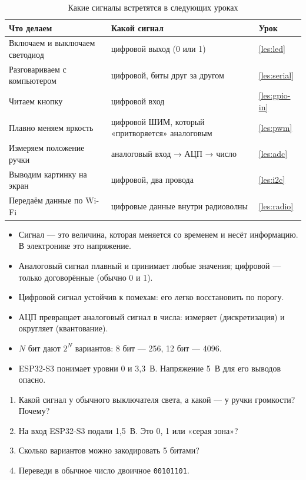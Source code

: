 \begin{table}[H]
\centering\small
\begin{tabularx}{\textwidth}{@{}l X l@{}}
\toprule
Что делаем & Какой сигнал & Урок\\
\midrule
Включаем и выключаем светодиод & цифровой выход (0 или 1) & \ref{les:led}\\
Разговариваем с компьютером & цифровой, биты друг за другом & \ref{les:serial}\\
Читаем кнопку & цифровой вход & \ref{les:gpio-in}\\
Плавно меняем яркость & цифровой ШИМ, который «притворяется» аналоговым & \ref{les:pwm}\\
Измеряем положение ручки & аналоговый вход → АЦП → число & \ref{les:adc}\\
Выводим картинку на экран & цифровой, два провода & \ref{les:i2c}\\
Передаём данные по Wi-Fi & цифровые данные внутри радиоволны & \ref{les:radio}\\
\bottomrule
\end{tabularx}
\caption{Какие сигналы встретятся в следующих уроках}
\end{table}

\begin{summary}
\begin{itemize}[leftmargin=*]
  \item Сигнал --- это величина, которая меняется со временем и несёт информацию. В электронике это напряжение.
  \item Аналоговый сигнал плавный и принимает любые значения; цифровой --- только договорённые (обычно 0 и 1).
  \item Цифровой сигнал устойчив к помехам: его легко восстановить по порогу.
  \item АЦП превращает аналоговый сигнал в числа: измеряет (дискретизация) и округляет (квантование).
  \item $N$ бит дают $2^N$ вариантов: 8 бит --- 256, 12 бит --- 4096.
  \item ESP32-S3 понимает уровни 0 и 3,3~В. Напряжение 5~В для его выводов опасно.
\end{itemize}
\end{summary}

\begin{quiz}
\begin{enumerate}
  \item Какой сигнал у обычного выключателя света, а какой --- у ручки громкости? Почему?
  \item На вход ESP32-S3 подали 1,5~В. Это 0, 1 или «серая зона»?
  \item Сколько вариантов можно закодировать 5 битами?
  \item Переведи в обычное число двоичное \texttt{00101101}.
\end{enumerate}
\end{quiz}


